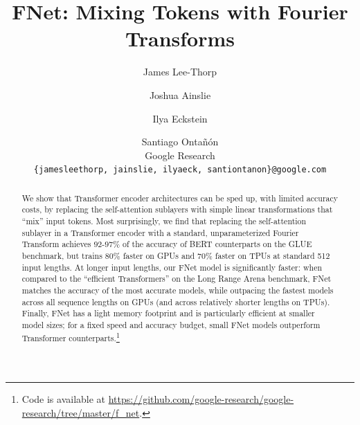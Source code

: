 \documentclass[11pt]{article}
\title{FNet: Mixing Tokens with Fourier Transforms}
\author{
  James Lee-Thorp \and Joshua Ainslie \and Ilya Eckstein \and Santiago Onta\~{n}\'{o}n \\
  Google Research \\
  \texttt{\{jamesleethorp, jainslie, ilyaeck, santiontanon\}@google.com}
}
\begin{document}
\maketitle

\begin{abstract}
  We show that Transformer encoder architectures can be sped up, with limited accuracy costs, by replacing the self-attention sublayers with simple linear transformations that ``mix'' input tokens. Most surprisingly, we find that replacing the self-attention sublayer in a Transformer encoder with a standard, unparameterized Fourier Transform achieves $92$-$97\%$ of the accuracy of BERT counterparts on the GLUE benchmark, but trains $80\%$ faster on GPUs and $70\%$ faster on TPUs at standard 512 input lengths. At longer input lengths, our FNet model is significantly faster:  when compared to the ``efficient Transformers'' on the Long Range Arena benchmark, FNet matches the accuracy of the most accurate models, while outpacing the fastest models across all sequence lengths on GPUs (and across relatively shorter lengths on TPUs). Finally, FNet has a light memory footprint and is particularly efficient at smaller model sizes; for a fixed speed and accuracy budget, small FNet models outperform Transformer counterparts.\footnote{Code is available at \url{https://github.com/google-research/google-research/tree/master/f_net}.}
\end{abstract}












\appendix

\end{document}
